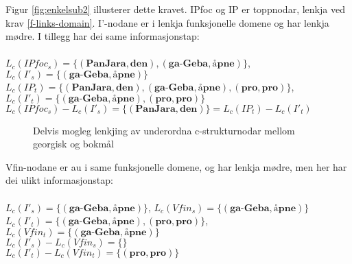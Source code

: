 \documentclass[11pt,a4paper,oneside,draft]{book}
\begin{document}
Figur \ref{fig:enkelsub2} illusterer dette kravet. IPfoc og IP er
toppnodar, lenkja ved krav \ref{f-links-domain}. I'-nodane er i lenkja
funksjonelle domene og har lenkja mødre. I tillegg har dei same
informasjonstap:\\
\\$L_c(IPfoc_s)=\{(\textbf{PanJara},\textbf{den}),(\textbf{ga-Geba},\textbf{åpne})\}$,
$L_c(I'_s)=\{(\textbf{ga-Geba},\textbf{åpne})\}$
\\$L_c(IP_t)=\{(\textbf{PanJara},\textbf{den}),(\textbf{ga-Geba},\textbf{åpne}),(\textbf{pro},\textbf{pro})\}$,
$L_c(I'_t)=\{(\textbf{ga-Geba},\textbf{åpne}),(\textbf{pro},\textbf{pro})\}$
\\$L_c(IPfoc_s)-L_c(I'_s)=\{(\textbf{PanJara},\textbf{den})\}=L_c(IP_t)-L_c(I'_t)$\\

\begin{figure}[htp]
\centering
{}


\caption{Delvis mogleg lenkjing av underordna c-strukturnodar mellom georgisk og bokmål}
 \label{fig:ikkjesub2}
\end{figure}
 
Vfin-nodane er au i same funksjonelle domene, og har lenkja mødre, men
her har dei ulikt informasjonstap:\\
\\$L_c(I'_s)=\{(\textbf{ga-Geba},\textbf{åpne})\}$,
$L_c(Vfin_s)=\{(\textbf{ga-Geba},\textbf{åpne})\}$
\\$L_c(I'_t)=\{(\textbf{ga-Geba},\textbf{åpne}),(\textbf{pro},\textbf{pro})\}$,
$L_c(Vfin_t)=\{(\textbf{ga-Geba},\textbf{åpne})\}$
\\$L_c(I'_s)-L_c(Vfin_s)=\{\}$
\\$L_c(I'_t)-L_c(Vfin_t)=\{(\textbf{pro},\textbf{pro})\}$\\
\end{document}
